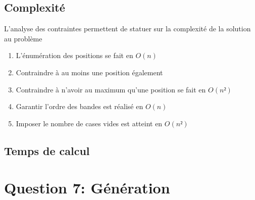 \documentclass[a4paper,12pt]{report}
\begin{document}
\section{Complexité}

L'analyse des contraintes permettent de statuer sur la complexité de la solution au problème

\begin{enumerate}
\item L'énumération des positions se fait en $O(n)$
\item Contraindre à au moins une position également
\item Contraindre à n'avoir au maximum qu'une position se fait en $O(n²)$
\item Garantir l'ordre des bandes est réalisé en $O(n)$
\item Imposer le nombre de cases vides est atteint en $O(n²)$
\end{enumerate}

\section{Temps de calcul}


\chapter{Question 7: Génération}
\end{document}
